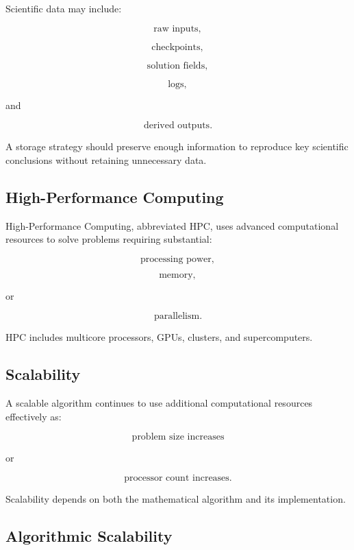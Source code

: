 Scientific data may include:

\[
\boxed{
\text{raw inputs},
}
\]

\[
\boxed{
\text{checkpoints},
}
\]

\[
\boxed{
\text{solution fields},
}
\]

\[
\boxed{
\text{logs},
}
\]

and

\[
\boxed{
\text{derived outputs}.
}
\]

A storage strategy should preserve enough information to reproduce key
scientific conclusions without retaining unnecessary data.

\subsection{High-Performance Computing}
\label{subsec:high-performance-computing}

High-Performance Computing, abbreviated HPC, uses advanced computational
resources to solve problems requiring substantial:

\[
\boxed{
\text{processing power},
}
\]

\[
\boxed{
\text{memory},
}
\]

or

\[
\boxed{
\text{parallelism}.
}
\]

HPC includes multicore processors, GPUs, clusters, and supercomputers.

\subsection{Scalability}
\label{subsec:scientific-scalability}

A scalable algorithm continues to use additional computational resources
effectively as:

\[
\boxed{
\text{problem size increases}
}
\]

or

\[
\boxed{
\text{processor count increases}.
}
\]

Scalability depends on both the mathematical algorithm and its
implementation.

\subsection{Algorithmic Scalability}
\label{subsec:algorithmic-scalability}

